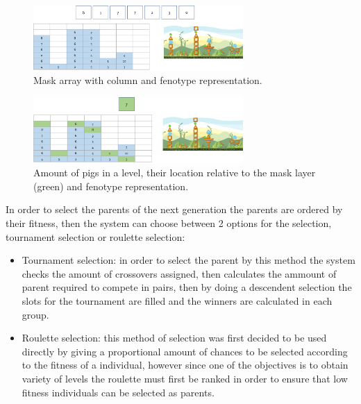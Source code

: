 \documentclass[conference]{IEEEtran}
\begin{document}
    \begin{figure}[htbp]
        \centerline{\includegraphics[width=80mm]{Images/mask_layer.png}}
        \caption{Mask array with column and fenotype representation.}
        \label{mask_layer}
    \end{figure}
    
    \begin{figure}[htbp]
        \centerline{\includegraphics[width=80mm]{Images/enemy_layer.png}}
        \caption{Amount of pigs in a level, their location relative to the mask layer (green) and fenotype representation.}
        \label{enemy_layer}
    \end{figure}
    
    In order to select the parents of the next generation the parents are ordered by
    their fitness, then the system can choose between 2 options for the selection,
    tournament selection or roulette selection:
    
    \begin{itemize}
        \item Tournament selection: in order to select the parent by this method the
        system checks the amount of crossovers assigned, then calculates the ammount
        of parent required to compete in pairs, then by doing a descendent selection
        the slots for the tournament are filled and the winners are calculated in
        each group.
        \item Roulette selection: this method of selection was first decided to be
        used directly by giving a proportional amount of chances to be selected
        according to the fitness of a individual, however since one of the
        objectives is to obtain variety of levels the roulette must first be ranked
        in order to ensure that low fitness individuals can be selected as parents.
    \end{itemize}
    
\end{document}
